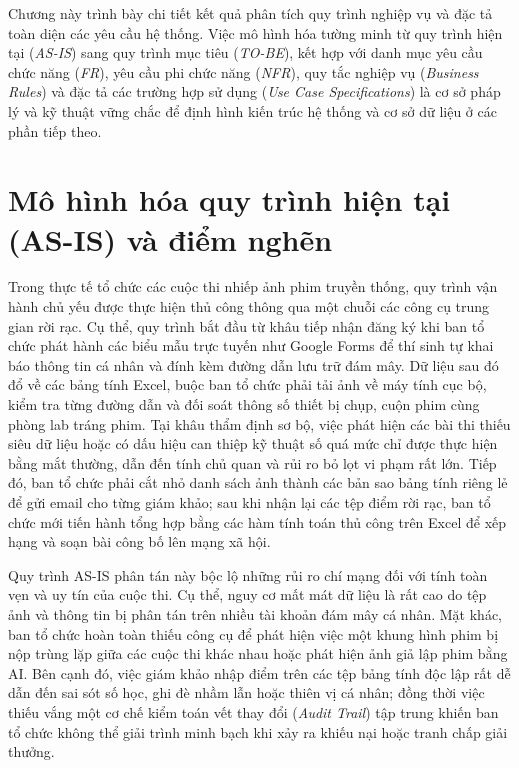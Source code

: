 
Chương này trình bày chi tiết kết quả phân tích quy trình nghiệp vụ và đặc tả toàn diện các yêu cầu hệ thống. Việc mô hình hóa tường minh từ quy trình hiện tại (\textit{AS-IS}) sang quy trình mục tiêu (\textit{TO-BE}), kết hợp với danh mục yêu cầu chức năng (\textit{FR}), yêu cầu phi chức năng (\textit{NFR}), quy tắc nghiệp vụ (\textit{Business Rules}) và đặc tả các trường hợp sử dụng (\textit{Use Case Specifications}) là cơ sở pháp lý và kỹ thuật vững chắc để định hình kiến trúc hệ thống và cơ sở dữ liệu ở các phần tiếp theo.

\section{Mô hình hóa quy trình hiện tại (AS-IS) và điểm nghẽn}
\label{s:c2_asis}

Trong thực tế tổ chức các cuộc thi nhiếp ảnh phim truyền thống, quy trình vận hành chủ yếu được thực hiện thủ công thông qua một chuỗi các công cụ trung gian rời rạc. Cụ thể, quy trình bắt đầu từ khâu tiếp nhận đăng ký khi ban tổ chức phát hành các biểu mẫu trực tuyến như Google Forms để thí sinh tự khai báo thông tin cá nhân và đính kèm đường dẫn lưu trữ đám mây. Dữ liệu sau đó đổ về các bảng tính Excel, buộc ban tổ chức phải tải ảnh về máy tính cục bộ, kiểm tra từng đường dẫn và đối soát thông số thiết bị chụp, cuộn phim cùng phòng lab tráng phim. Tại khâu thẩm định sơ bộ, việc phát hiện các bài thi thiếu siêu dữ liệu hoặc có dấu hiệu can thiệp kỹ thuật số quá mức chỉ được thực hiện bằng mắt thường, dẫn đến tính chủ quan và rủi ro bỏ lọt vi phạm rất lớn. Tiếp đó, ban tổ chức phải cắt nhỏ danh sách ảnh thành các bản sao bảng tính riêng lẻ để gửi email cho từng giám khảo; sau khi nhận lại các tệp điểm rời rạc, ban tổ chức mới tiến hành tổng hợp bằng các hàm tính toán thủ công trên Excel để xếp hạng và soạn bài công bố lên mạng xã hội.

Quy trình AS-IS phân tán này bộc lộ những rủi ro chí mạng đối với tính toàn vẹn và uy tín của cuộc thi. Cụ thể, nguy cơ mất mát dữ liệu là rất cao do tệp ảnh và thông tin bị phân tán trên nhiều tài khoản đám mây cá nhân. Mặt khác, ban tổ chức hoàn toàn thiếu công cụ để phát hiện việc một khung hình phim bị nộp trùng lặp giữa các cuộc thi khác nhau hoặc phát hiện ảnh giả lập phim bằng AI. Bên cạnh đó, việc giám khảo nhập điểm trên các tệp bảng tính độc lập rất dễ dẫn đến sai sót số học, ghi đè nhầm lẫn hoặc thiên vị cá nhân; đồng thời việc thiếu vắng một cơ chế kiểm toán vết thay đổi (\textit{Audit Trail}) tập trung khiến ban tổ chức không thể giải trình minh bạch khi xảy ra khiếu nại hoặc tranh chấp giải thưởng.


